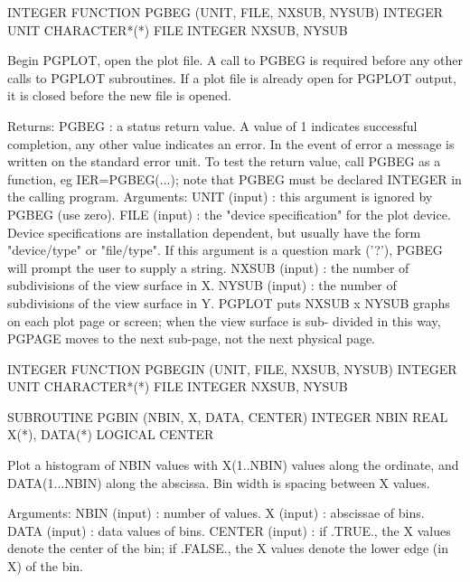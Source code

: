{\eightpoint\begintt
      INTEGER FUNCTION PGBEG (UNIT, FILE, NXSUB, NYSUB)
      INTEGER       UNIT
      CHARACTER*(*) FILE
      INTEGER       NXSUB, NYSUB
 
Begin PGPLOT, open the plot file.  A call to PGBEG is
required before any other calls to PGPLOT subroutines.  If a plot
file is already open for PGPLOT output, it is closed before the new
file is opened.
 
Returns:
 PGBEG         : a status return value. A value of 1 indicates
                   successful completion, any other value indicates
                   an error. In the event of error a message is
                   written on the standard error unit.  
                   To test the return value, call
                   PGBEG as a function, eg IER=PGBEG(...); note
                   that PGBEG must be declared INTEGER in the
                   calling program.
Arguments:
 UNIT  (input)   : this argument is ignored by PGBEG (use zero).
 FILE  (input)   : the "device specification" for the plot device.
                   Device specifications are installation dependent,
                   but usually have the form "device/type" or
                   "file/type". If this argument is a
                   question mark ('?'), PGBEG will prompt the user
                   to supply a string.
 NXSUB  (input)  : the number of subdivisions of the view surface in
                   X.
 NYSUB  (input)  : the number of subdivisions of the view surface in
                   Y. PGPLOT puts NXSUB x NYSUB graphs on each plot
                   page or screen; when the view surface is sub-
                   divided in this way, PGPAGE moves to the next
                   sub-page, not the  next physical page.
\endtt}

{\eightpoint\begintt
      INTEGER FUNCTION PGBEGIN (UNIT, FILE, NXSUB, NYSUB)
      INTEGER       UNIT
      CHARACTER*(*) FILE
      INTEGER       NXSUB, NYSUB   
\endtt}

{\eightpoint\begintt
      SUBROUTINE PGBIN (NBIN, X, DATA, CENTER)
      INTEGER NBIN
      REAL X(*), DATA(*)
      LOGICAL CENTER
 
Plot a histogram of NBIN values with X(1..NBIN) values along
the ordinate, and DATA(1...NBIN) along the abscissa. Bin width is
spacing between X values.
 
Arguments:
 NBIN   (input)  : number of values.
 X      (input)  : abscissae of bins.
 DATA   (input)  : data values of bins.
 CENTER (input)  : if .TRUE., the X values denote the center of the
                   bin; if .FALSE., the X values denote the lower
                   edge (in X) of the bin.
\endtt}

